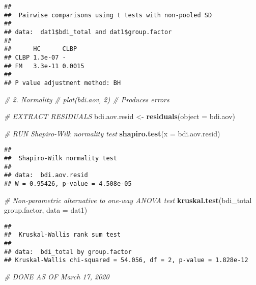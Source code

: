 \documentclass[]{article}
\newenvironment{Shaded}{\begin{snugshade}}{\end{snugshade}}
\newcommand{\KeywordTok}[1]{\textcolor[rgb]{0.13,0.29,0.53}{\textbf{#1}}}
\newcommand{\DataTypeTok}[1]{\textcolor[rgb]{0.13,0.29,0.53}{#1}}
\newcommand{\StringTok}[1]{\textcolor[rgb]{0.31,0.60,0.02}{#1}}
\newcommand{\CommentTok}[1]{\textcolor[rgb]{0.56,0.35,0.01}{\textit{#1}}}
\newcommand{\OperatorTok}[1]{\textcolor[rgb]{0.81,0.36,0.00}{\textbf{#1}}}
\newcommand{\NormalTok}[1]{#1}
\begin{document}
\begin{verbatim}
## 
##  Pairwise comparisons using t tests with non-pooled SD 
## 
## data:  dat1$bdi_total and dat1$group.factor 
## 
##      HC      CLBP  
## CLBP 1.3e-07 -     
## FM   3.3e-11 0.0015
## 
## P value adjustment method: BH
\end{verbatim}

\begin{Shaded}
\begin{Highlighting}[]
\CommentTok{#   2. Normality}
\CommentTok{#   plot(bdi.aov, 2) #  Produces errors}

\CommentTok{#   EXTRACT RESIDUALS}
\NormalTok{bdi.aov.resid <-}\StringTok{ }\KeywordTok{residuals}\NormalTok{(}\DataTypeTok{object =}\NormalTok{ bdi.aov)}

\CommentTok{#   RUN Shapiro-Wilk normality test}
\KeywordTok{shapiro.test}\NormalTok{(}\DataTypeTok{x =}\NormalTok{ bdi.aov.resid)}
\end{Highlighting}
\end{Shaded}

\begin{verbatim}
## 
##  Shapiro-Wilk normality test
## 
## data:  bdi.aov.resid
## W = 0.95426, p-value = 4.508e-05
\end{verbatim}

\begin{Shaded}
\begin{Highlighting}[]
\CommentTok{#   Non-parametric alternative to one-way ANOVA test}
\KeywordTok{kruskal.test}\NormalTok{(bdi_total }\OperatorTok{~}\StringTok{ }\NormalTok{group.factor, }\DataTypeTok{data =}\NormalTok{ dat1)}
\end{Highlighting}
\end{Shaded}

\begin{verbatim}
## 
##  Kruskal-Wallis rank sum test
## 
## data:  bdi_total by group.factor
## Kruskal-Wallis chi-squared = 54.056, df = 2, p-value = 1.828e-12
\end{verbatim}

\begin{Shaded}
\begin{Highlighting}[]
\CommentTok{#       DONE AS OF March 17, 2020}
\end{Highlighting}
\end{Shaded}
\end{document}
